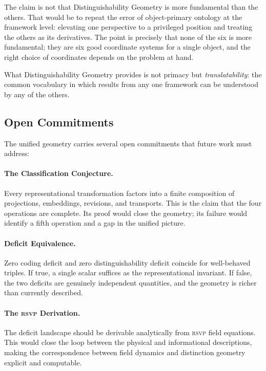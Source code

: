 \documentclass[12pt, letterpaper]{article}
\theoremstyle{remark}
\newcommand{\rsvp}{\textsc{rsvp}}
\begin{document}
The claim is not that Distinguishability Geometry is more fundamental than
the others.  That would be to repeat the error of object-primary ontology
at the framework level: elevating one perspective to a privileged position
and treating the others as its derivatives.  The point is precisely that
none of the six is more fundamental; they are six good coordinate systems
for a single object, and the right choice of coordinates depends on the
problem at hand.

What Distinguishability Geometry provides is not primacy but
\emph{translatability}: the common vocabulary in which results from any
one framework can be understood by any of the others.

\subsection{Open Commitments}

The unified geometry carries several open commitments that future work
must address:

\paragraph{The Classification Conjecture.}
Every representational transformation factors into a finite composition
of projections, embeddings, revisions, and transports.  This is the claim
that the four operations are complete.  Its proof would close the geometry;
its failure would identify a fifth operation and a gap in the unified picture.

\paragraph{Deficit Equivalence.}
Zero coding deficit and zero distinguishability deficit coincide for
well-behaved triples.  If true, a single scalar suffices as the
representational invariant.  If false, the two deficits are genuinely
independent quantities, and the geometry is richer than currently described.

\paragraph{The \rsvp{} Derivation.}
The deficit landscape should be derivable analytically from \rsvp{} field
equations.  This would close the loop between the physical and
informational descriptions, making the correspondence between field
dynamics and distinction geometry explicit and computable.
\end{document}
